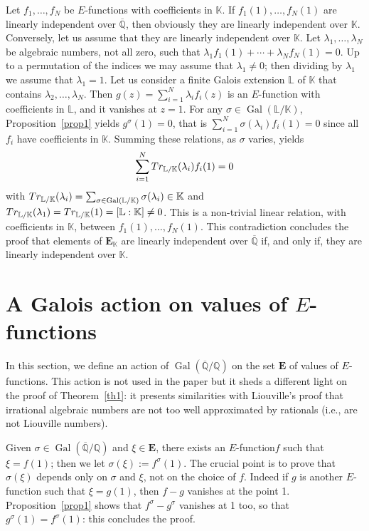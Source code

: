 \documentclass[11pt]{article}
\numberwithin{equation}{section}
\newcommand{\Efunction}{$E$\nobreakdash-func\-tion\xspace}
\newcommand{\Efunctions}{$E$\nobreakdash-func\-tions\xspace}
\theoremstyle{definition}
\newcommand{\Q}{\mathbb{Q}}
\newcommand{\K}{\mathbb{K}}
\renewcommand{\L}{\mathbb{L}}
\newcommand{\EE}{{\mathbf E}}
\newcommand{\Qbar}{\overline{\mathbb Q}}
\newcommand{\EK}{\EE_{\K}}
\DeclareMathOperator{\Gal}{Gal}
\begin{document}
Let $f_1,\ldots,f_N$ be \Efunctions with coefficients in $\K$. If $f_1(1),\ldots,f_N(1)$ are linearly independent over $\Qbar$, then obviously they are linearly independent over $\K$. Conversely, let us assume that they are linearly independent over $\K$. Let $\lambda_1,\ldots,\lambda_N$ be algebraic numbers, not all zero, such that $ \lambda_1 f_1(1) + \cdots + \lambda_N f_N(1)=0$. Up to a permutation of the indices we may assume that $\lambda_1\neq 0$; then dividing by $\lambda_1$ we assume that $\lambda_1=1$. Let us consider a finite Galois extension $\L$ of $\K$ that contains
$\lambda_2,\ldots,\lambda_N$. Then $g(z) = \sum_{i=1}^N \lambda_i f_i(z)$ is an \Efunction with coefficients in $\L$, and it vanishes at $z=1$. For any $\sigma\in\Gal(\L/\K)$, Proposition~\ref{prop1} yields $g^\sigma(1)=0$, that is $\sum_{i=1}^N \sigma(\lambda_i) f_i(1)=0$ since all $f_i$ have coefficients in $\K$. Summing these relations, as $\sigma$ varies, yields\vspace*{-3pt}
\[
\sum_{i=1}^N {\rm Tr}_{\L/\K} (\lambda_i) f_i(1)=0
\]
with $ {\rm Tr}_{\L/\K} (\lambda_i) = \sum_{\sigma\in\Gal(\L/\K)} \sigma(\lambda_i) \in \K$ and $ {\rm Tr}_{\L/\K} (\lambda_1 ) = {\rm Tr}_{\L/\K} (1) = [\L:\K]\neq 0$. This is a non-trivial linear relation, with coefficients in $\K$, between $f_1(1),\ldots,f_N(1)$. This contradiction concludes the proof that elements of $\EK$ are linearly independent over $\Qbar$ if, and only if, they are linearly independent over $\K$.

\section{A Galois action on values of \texorpdfstring{\protect\Efunctions}{Ef}} \label{secGalois}

In this section, we define an action of $\Gal(\Qbar/\Q)$ on the set $\EE$ of values of \Efunctions.
This action is not used in the paper but it sheds a different light on the proof of Theorem~\ref{th1}: it presents similarities with Liouville's proof that irrational algebraic numbers are not too well approximated by rationals (i.e., are not Liouville numbers).

Given $\sigma\in \Gal(\Qbar/\Q)$ and $\xi\in\EE$, there exists an \Efunction $f$ such that $\xi=f(1)$; then we let $\sigma(\xi) := f^\sigma(1)$. The crucial point is to prove that $\sigma(\xi) $ depends only on $\sigma $ and $\xi$, not on the choice of $f$. Indeed if $g$ is another \Efunction such that $\xi=g(1)$, then $f-g$ vanishes at the point 1. Proposition~\ref{prop1} shows that $f^\sigma-g^\sigma$ vanishes at 1 too, so that $ g^\sigma(1)= f^\sigma(1)$: this concludes the proof.
\end{document}
